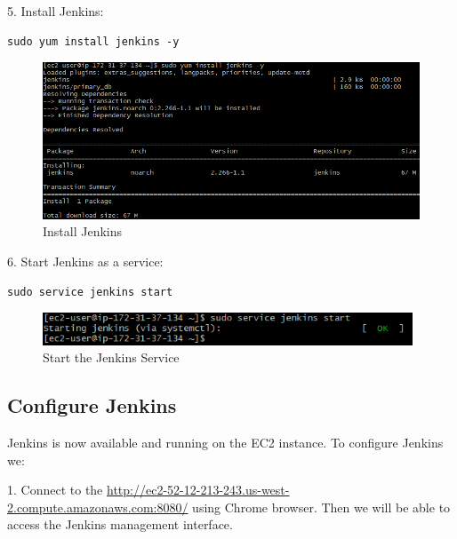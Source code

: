 \documentclass[12pt,a4paper,twoside]{article}
\begin{document}
5. Install Jenkins:


\begin{verbatim}
sudo yum install jenkins -y
\end{verbatim}


\begin{figure}[H]
    \centering
        \includegraphics[width=15cm]{images-aws/18-install-jenkins.png}
        \caption{Install Jenkins}
\end{figure}


6. Start Jenkins as a service:


\begin{verbatim}
sudo service jenkins start
\end{verbatim}


\begin{figure}[H]
    \centering
        \includegraphics[width=11cm]{images-aws/19-start-jenkins.png}
        \caption{Start the Jenkins Service}
\end{figure}



\newpage

\subsection{Configure Jenkins}


Jenkins is now available and running on the EC2 instance. To configure Jenkins we:


1. Connect to the \url{http://ec2-52-12-213-243.us-west-2.compute.amazonaws.com:8080/} using Chrome browser.
Then we will be able to access the Jenkins management interface.
\end{document}

